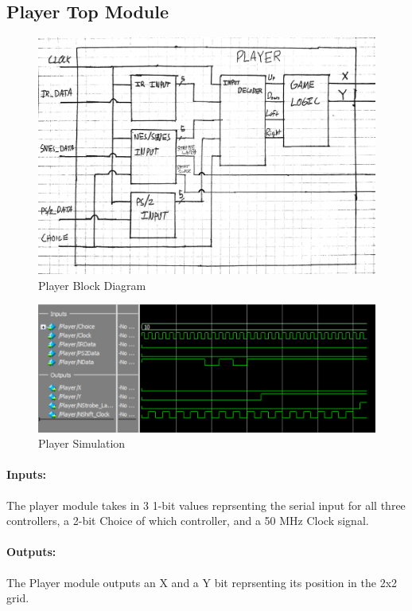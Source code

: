 \documentclass[]{article}
\begin{document}
\subsection{Player Top Module}
\begin{figure}[H]\centering
    \includegraphics[width=\linewidth]{figures/Player_Block.jpg}
    \caption{Player Block Diagram}
    \label{fig:playerBlock}
\end{figure}
\begin{figure}[H]\centering
    \includegraphics[width=\linewidth]{figures/Player_Sim.png}
    \caption{Player Simulation}
    \label{fig:playerSim}
\end{figure}
\paragraph{Inputs:} The player module takes in 3 1-bit values reprsenting the serial input for all three controllers, a 2-bit Choice of which controller, and a 50 MHz Clock signal.
\paragraph{Outputs:} The Player module outputs an X and a Y bit reprsenting its position in the 2x2 grid.
\end{document}
